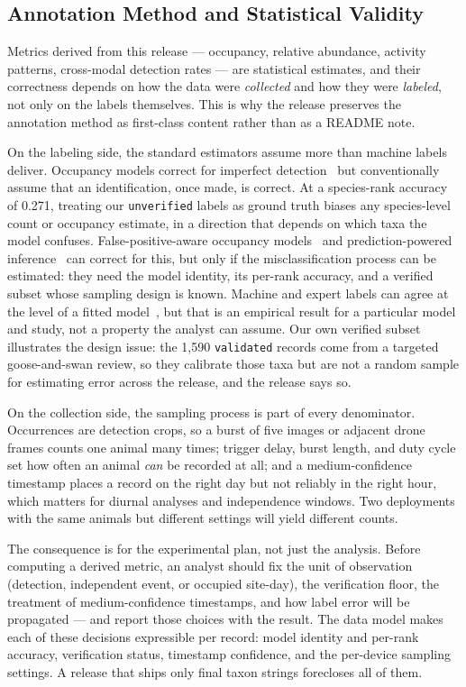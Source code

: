 \documentclass[sigconf]{acmart}
\begin{document}
\subsection{Annotation Method and Statistical Validity}
\label{sec:validity}

Metrics derived from this release --- occupancy, relative abundance,
activity patterns, cross-modal detection rates --- are statistical
estimates, and their correctness depends on how the data were
\emph{collected} and how they were \emph{labeled}, not only on the
labels themselves. This is why the release preserves the annotation
method as first-class content rather than as a README note.

On the labeling side, the standard estimators assume more than machine
labels deliver. Occupancy models correct for imperfect
detection~\cite{mackenzie2002occupancy} but conventionally assume that
an identification, once made, is correct. At a species-rank accuracy of
0.271, treating our \texttt{unverified} labels as ground truth biases
any species-level count or occupancy estimate, in a direction that
depends on which taxa the model confuses. False-positive-aware occupancy
models~\cite{royle2006falsepositive,chambert2015falsepositive} and
prediction-powered inference~\cite{angelopoulos2023ppi} can correct
for this, but only if the misclassification process can be estimated:
they need the model identity, its per-rank accuracy, and a verified
subset whose sampling design is known. Machine and expert labels can
agree at the level of a fitted model~\cite{Thornton2026AI}, but that is
an empirical result for a particular model and study, not a property
the analyst can assume. Our own verified subset illustrates the design
issue: the 1{,}590 \texttt{validated} records come from a targeted
goose-and-swan review, so they calibrate those taxa but are not a random
sample for estimating error across the release, and the release says
so.

On the collection side, the sampling process is part of every
denominator. Occurrences are detection crops, so a burst of five images
or adjacent drone frames counts one animal many times; trigger delay,
burst length, and duty cycle set how often an animal \emph{can} be
recorded at all; and a medium-confidence timestamp places a record on
the right day but not reliably in the right hour, which matters for
diurnal analyses and independence windows. Two deployments with the
same animals but different settings will yield different counts.

The consequence is for the experimental plan, not just the analysis.
Before computing a derived metric, an analyst should fix the unit of
observation (detection, independent event, or occupied site-day), the
verification floor, the treatment of medium-confidence timestamps, and
how label error will be propagated --- and report those choices with the
result. The data model makes each of these decisions expressible per
record: model identity and per-rank accuracy, verification status,
timestamp confidence, and the per-device sampling settings. A release
that ships only final taxon strings forecloses all of them.
\end{document}
